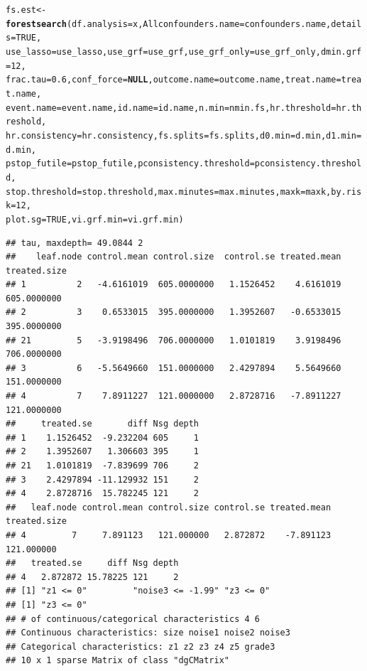\documentclass[smallextended]{svjour3}
\makeatletter
\newcommand{\hlnum}[1]{\textcolor[rgb]{0.686,0.059,0.569}{#1}}%
\newcommand{\hlstd}[1]{\textcolor[rgb]{0.345,0.345,0.345}{#1}}%
\newcommand{\hlkwa}[1]{\textcolor[rgb]{0.161,0.373,0.58}{\textbf{#1}}}%
\newcommand{\hlkwb}[1]{\textcolor[rgb]{0.69,0.353,0.396}{#1}}%
\newcommand{\hlkwc}[1]{\textcolor[rgb]{0.333,0.667,0.333}{#1}}%
\newcommand{\hlkwd}[1]{\textcolor[rgb]{0.737,0.353,0.396}{\textbf{#1}}}%
\newenvironment{kframe}{%
 \def\at@end@of@kframe{}%
 \ifinner\ifhmode%
  \def\at@end@of@kframe{\end{minipage}}%
  \begin{minipage}{\columnwidth}%
 \fi\fi%
 \def\FrameCommand##1{\hskip\@totalleftmargin \hskip-\fboxsep
 \colorbox{shadecolor}{##1}\hskip-\fboxsep
     \hskip-\linewidth \hskip-\@totalleftmargin \hskip\columnwidth}%
 \MakeFramed {\advance\hsize-\width
   \@totalleftmargin\z@ \linewidth\hsize
   \@setminipage}}%
 {\par\unskip\endMakeFramed%
 \at@end@of@kframe}
\newenvironment{knitrout}{}{} %
\makeatother
\begin{document}
\begin{knitrout}
\begin{kframe}
\begin{alltt}
\hlstd{fs.est} \hlkwb{<-} \hlkwd{forestsearch}\hlstd{(}\hlkwc{df.analysis} \hlstd{= x,} \hlkwc{Allconfounders.name} \hlstd{= confounders.name,} \hlkwc{details} \hlstd{=} \hlnum{TRUE}\hlstd{,}
    \hlkwc{use_lasso} \hlstd{= use_lasso,} \hlkwc{use_grf} \hlstd{= use_grf,} \hlkwc{use_grf_only} \hlstd{= use_grf_only,} \hlkwc{dmin.grf} \hlstd{=} \hlnum{12}\hlstd{,}
    \hlkwc{frac.tau} \hlstd{=} \hlnum{0.6}\hlstd{,} \hlkwc{conf_force} \hlstd{=} \hlkwa{NULL}\hlstd{,} \hlkwc{outcome.name} \hlstd{= outcome.name,} \hlkwc{treat.name} \hlstd{= treat.name,}
    \hlkwc{event.name} \hlstd{= event.name,} \hlkwc{id.name} \hlstd{= id.name,} \hlkwc{n.min} \hlstd{= nmin.fs,} \hlkwc{hr.threshold} \hlstd{= hr.threshold,}
    \hlkwc{hr.consistency} \hlstd{= hr.consistency,} \hlkwc{fs.splits} \hlstd{= fs.splits,} \hlkwc{d0.min} \hlstd{= d.min,} \hlkwc{d1.min} \hlstd{= d.min,}
    \hlkwc{pstop_futile} \hlstd{= pstop_futile,} \hlkwc{pconsistency.threshold} \hlstd{= pconsistency.threshold,}
    \hlkwc{stop.threshold} \hlstd{= stop.threshold,} \hlkwc{max.minutes} \hlstd{= max.minutes,} \hlkwc{maxk} \hlstd{= maxk,} \hlkwc{by.risk} \hlstd{=} \hlnum{12}\hlstd{,}
    \hlkwc{plot.sg} \hlstd{=} \hlnum{TRUE}\hlstd{,} \hlkwc{vi.grf.min} \hlstd{= vi.grf.min)}
\end{alltt}
\begin{verbatim}
## tau, maxdepth= 49.0844 2 
##    leaf.node control.mean control.size  control.se treated.mean treated.size
## 1          2   -4.6161019  605.0000000   1.1526452    4.6161019  605.0000000
## 2          3    0.6533015  395.0000000   1.3952607   -0.6533015  395.0000000
## 21         5   -3.9198496  706.0000000   1.0101819    3.9198496  706.0000000
## 3          6   -5.5649660  151.0000000   2.4297894    5.5649660  151.0000000
## 4          7    7.8911227  121.0000000   2.8728716   -7.8911227  121.0000000
##     treated.se       diff Nsg depth
## 1    1.1526452  -9.232204 605     1
## 2    1.3952607   1.306603 395     1
## 21   1.0101819  -7.839699 706     2
## 3    2.4297894 -11.129932 151     2
## 4    2.8728716  15.782245 121     2
##   leaf.node control.mean control.size control.se treated.mean treated.size
## 4         7     7.891123   121.000000   2.872872    -7.891123   121.000000
##   treated.se     diff Nsg depth
## 4   2.872872 15.78225 121     2
## [1] "z1 <= 0"         "noise3 <= -1.99" "z3 <= 0"        
## [1] "z3 <= 0"
## # of continuous/categorical characteristics 4 6 
## Continuous characteristics: size noise1 noise2 noise3 
## Categorical characteristics: z1 z2 z3 z4 z5 grade3 
## 10 x 1 sparse Matrix of class "dgCMatrix"

\end{verbatim}
\end{kframe}
\end{knitrout}
\end{document}
